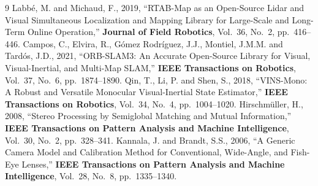 \documentclass[11pt,a4paper,notitlepage]{report}
\begin{document}
\begin{thebibliography}{9}
Labb\'e, M. and Michaud, F., 2019, ``RTAB-Map as an Open-Source Lidar and Visual Simultaneous Localization and Mapping Library for Large-Scale and Long-Term Online Operation,'' \textbf{Journal of Field Robotics}, Vol.~36, No.~2, pp.~416--446.
Campos, C., Elvira, R., G\'omez Rodr\'iguez, J.J., Montiel, J.M.M. and Tard\'os, J.D., 2021, ``ORB-SLAM3: An Accurate Open-Source Library for Visual, Visual-Inertial, and Multi-Map SLAM,'' \textbf{IEEE Transactions on Robotics}, Vol.~37, No.~6, pp.~1874--1890.
Qin, T., Li, P. and Shen, S., 2018, ``VINS-Mono: A Robust and Versatile Monocular Visual-Inertial State Estimator,'' \textbf{IEEE Transactions on Robotics}, Vol.~34, No.~4, pp.~1004--1020.
Hirschm\"uller, H., 2008, ``Stereo Processing by Semiglobal Matching and Mutual Information,'' \textbf{IEEE Transactions on Pattern Analysis and Machine Intelligence}, Vol.~30, No.~2, pp.~328--341.
Kannala, J. and Brandt, S.S., 2006, ``A Generic Camera Model and Calibration Method for Conventional, Wide-Angle, and Fish-Eye Lenses,'' \textbf{IEEE Transactions on Pattern Analysis and Machine Intelligence}, Vol.~28, No.~8, pp.~1335--1340.
\end{thebibliography}
\end{document}
